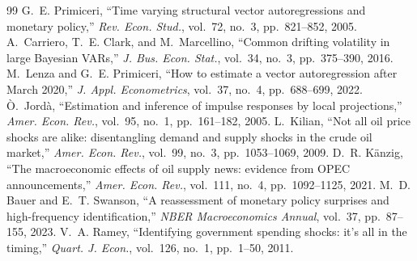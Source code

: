 \documentclass[conference]{IEEEtran}
\begin{document}
\begin{thebibliography}{99}
 G.~E. Primiceri, ``Time varying structural vector autoregressions and monetary policy,'' \emph{Rev. Econ. Stud.}, vol.~72, no.~3, pp.~821--852, 2005.
 A.~Carriero, T.~E. Clark, and M.~Marcellino, ``Common drifting volatility in large Bayesian VARs,'' \emph{J. Bus. Econ. Stat.}, vol.~34, no.~3, pp.~375--390, 2016.
 M.~Lenza and G.~E. Primiceri, ``How to estimate a vector autoregression after March 2020,'' \emph{J. Appl. Econometrics}, vol.~37, no.~4, pp.~688--699, 2022.
 \`O.~Jord\`a, ``Estimation and inference of impulse responses by local projections,'' \emph{Amer. Econ. Rev.}, vol.~95, no.~1, pp.~161--182, 2005.
 L.~Kilian, ``Not all oil price shocks are alike: disentangling demand and supply shocks in the crude oil market,'' \emph{Amer. Econ. Rev.}, vol.~99, no.~3, pp.~1053--1069, 2009.
 D.~R. K\"anzig, ``The macroeconomic effects of oil supply news: evidence from OPEC announcements,'' \emph{Amer. Econ. Rev.}, vol.~111, no.~4, pp.~1092--1125, 2021.
 M.~D. Bauer and E.~T. Swanson, ``A reassessment of monetary policy surprises and high-frequency identification,'' \emph{NBER Macroeconomics Annual}, vol.~37, pp.~87--155, 2023.
 V.~A. Ramey, ``Identifying government spending shocks: it's all in the timing,'' \emph{Quart. J. Econ.}, vol.~126, no.~1, pp.~1--50, 2011.
\end{thebibliography}
\end{document}

